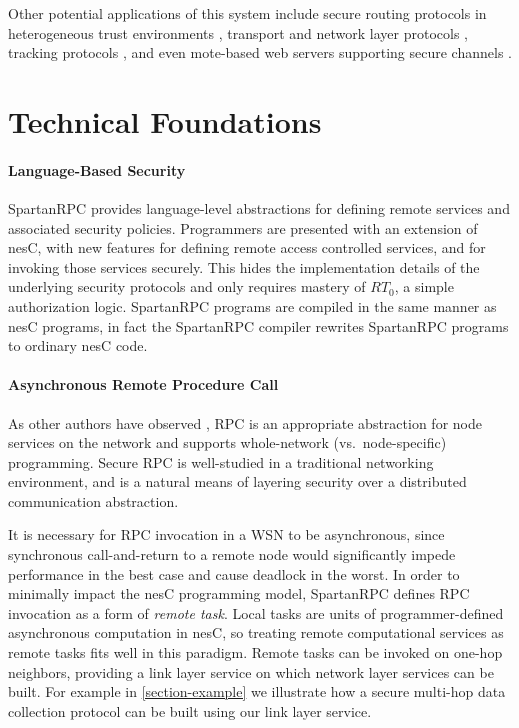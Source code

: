 Other potential applications of this system include secure routing protocols in heterogeneous
trust environments \cite{senroute-ahnj03}, transport and network layer protocols
\cite{perillo-heinzelman-2005}, tracking protocols \cite{brooks-ramanathan-sayeed-2003}, and
even mote-based web servers supporting secure channels \cite{1049776}.

\section{Technical Foundations}

\paragraph{Language-Based Security} SpartanRPC provides language-level abstractions for defining
remote services and associated security policies. Programmers are presented with an extension of
nesC, with new features for defining remote access controlled services, and for invoking those
services securely. This hides the implementation details of the underlying security protocols
and only requires mastery of $RT_0$, a simple authorization logic. SpartanRPC programs are
compiled in the same manner as nesC programs, in fact the SpartanRPC compiler rewrites
SpartanRPC programs to ordinary nesC code.

\paragraph{Asynchronous Remote Procedure Call} As other authors have observed
\cite{may-tinyrpc-2007}, RPC is an appropriate abstraction for node services on the network and
supports whole-network (vs.~node-specific) programming. Secure RPC is well-studied in a
traditional networking environment, and is a natural means of layering security over a
distributed communication abstraction.

It is necessary for RPC invocation in a WSN to be asynchronous, since synchronous
call-and-return to a remote node would significantly impede performance in the best case and
cause deadlock in the worst. In order to minimally impact the nesC programming model, SpartanRPC
defines RPC invocation as a form of \emph{remote task}. Local tasks are units of
programmer-defined asynchronous computation in nesC, so treating remote computational services
as remote tasks fits well in this paradigm. Remote tasks can be invoked on one-hop neighbors,
providing a link layer service on which network layer services can be built. For example in
\autoref{section-example} we illustrate how a secure multi-hop data collection protocol can be
built using our link layer service.

